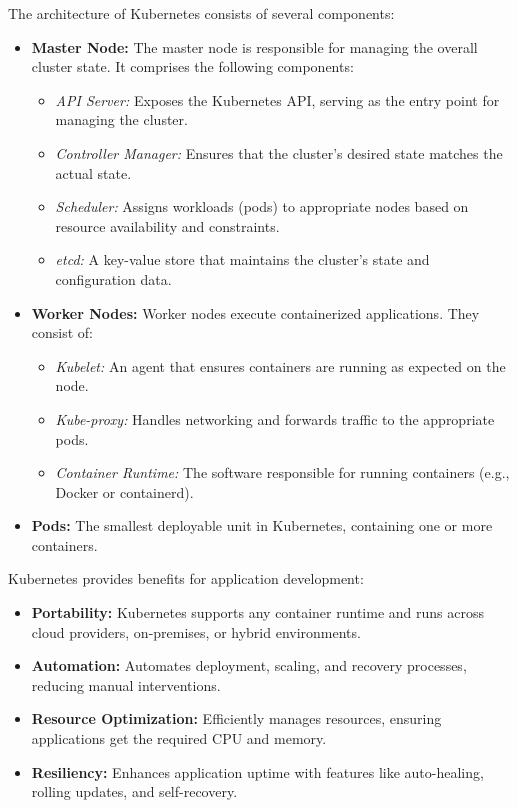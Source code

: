 \documentclass[preview]{standalone}
\begin{document}
The architecture of Kubernetes consists of several components:
\begin{itemize}
    \item \textbf{Master Node:} The master node is responsible for managing the
    overall cluster state. It comprises the following components:
    \begin{itemize}
        \item \textit{API Server:} Exposes the Kubernetes API, serving as the
        entry point for managing the cluster.
        \item \textit{Controller Manager:} Ensures that the cluster's desired
        state matches the actual state.
        \item \textit{Scheduler:} Assigns workloads (pods) to appropriate nodes
        based on resource availability and constraints.
        \item \textit{etcd:} A key-value store that maintains the cluster's
        state and configuration data.
    \end{itemize}
    \item \textbf{Worker Nodes:} Worker nodes execute containerized
    applications. They consist of:
    \begin{itemize}
        \item \textit{Kubelet:} An agent that ensures containers are running as
        expected on the node.
        \item \textit{Kube-proxy:} Handles networking and forwards traffic to
        the appropriate pods.
        \item \textit{Container Runtime:} The software responsible for running
        containers (e.g., Docker or containerd).
    \end{itemize}
    \item \textbf{Pods:} The smallest deployable unit in Kubernetes, containing
    one or more containers.
\end{itemize}

\newpage{}

Kubernetes provides benefits for application development:
\begin{itemize}
    \item \textbf{Portability:} Kubernetes supports any container runtime and
    runs across cloud providers, on-premises, or hybrid environments.
    \item \textbf{Automation:} Automates deployment, scaling, and recovery
    processes, reducing manual interventions.
    \item \textbf{Resource Optimization:} Efficiently manages resources,
    ensuring applications get the required CPU and memory.
    \item \textbf{Resiliency:} Enhances application uptime with features like
    auto-healing, rolling updates, and self-recovery.
\end{itemize}
\end{document}
